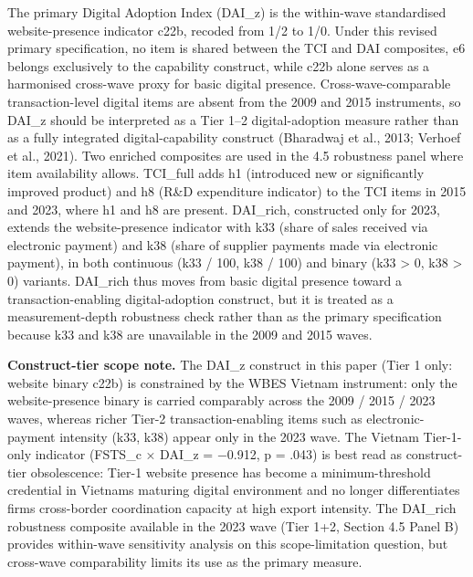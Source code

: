 \documentclass[12pt,a4paper]{article}
\begin{document}
The primary Digital Adoption Index (DAI\_z) is the within-wave
standardised website-presence indicator c22b, recoded from 1/2 to 1/0.
Under this revised primary specification, no item is shared between the
TCI and DAI composites, e6 belongs exclusively to the capability
construct, while c22b alone serves as a harmonised cross-wave proxy for
basic digital presence. Cross-wave-comparable transaction-level digital
items are absent from the 2009 and 2015 instruments, so DAI\_z should be
interpreted as a Tier 1--2 digital-adoption measure rather than as a
fully integrated digital-capability construct (Bharadwaj et al., 2013;
Verhoef et al., 2021). Two enriched composites are used in the 4.5
robustness panel where item availability allows. TCI\_full adds h1
(introduced new or significantly improved product) and h8 (R\&D
expenditure indicator) to the TCI items in 2015 and 2023, where h1 and
h8 are present. DAI\_rich, constructed only for 2023, extends the
website-presence indicator with k33 (share of sales received via
electronic payment) and k38 (share of supplier payments made via
electronic payment), in both continuous (k33 / 100, k38 / 100) and
binary (k33 \textgreater{} 0, k38 \textgreater{} 0) variants. DAI\_rich
thus moves from basic digital presence toward a transaction-enabling
digital-adoption construct, but it is treated as a measurement-depth
robustness check rather than as the primary specification because k33
and k38 are unavailable in the 2009 and 2015 waves.

\textbf{Construct-tier scope note.} The DAI\_z construct in this paper
(Tier 1 only: website binary c22b) is constrained by the WBES Vietnam
instrument: only the website-presence binary is carried comparably
across the 2009 / 2015 / 2023 waves, whereas richer Tier-2
transaction-enabling items such as electronic-payment intensity (k33,
k38) appear only in the 2023 wave. The Vietnam Tier-1-only indicator
(FSTS\_c × DAI\_z = −0.912, p = .043) is best read as construct-tier
obsolescence: Tier-1 website presence has become a minimum-threshold
credential in Vietnam\textquotesingle s maturing digital environment and
no longer differentiates firms\textquotesingle{} cross-border
coordination capacity at high export intensity. The DAI\_rich robustness
composite available in the 2023 wave (Tier 1+2, Section 4.5 Panel B)
provides within-wave sensitivity analysis on this scope-limitation
question, but cross-wave comparability limits its use as the primary
measure.
\end{document}
